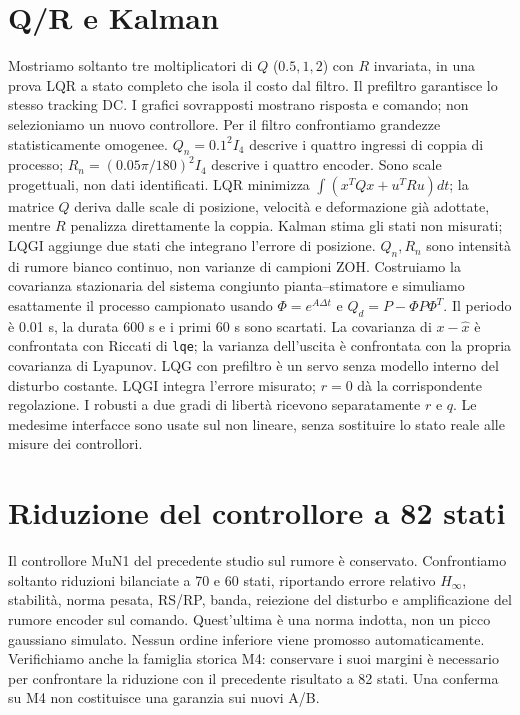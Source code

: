 \section{Q/R e Kalman}
Mostriamo soltanto tre moltiplicatori di $Q$ ($0.5,1,2$) con $R$ invariata,
in una prova LQR a stato completo che isola il costo dal filtro.
Il prefiltro garantisce lo stesso tracking DC. I grafici sovrapposti
mostrano risposta e comando; non selezioniamo un nuovo controllore.
Per il filtro confrontiamo grandezze statisticamente omogenee.
$Q_n=0.1^2I_4$ descrive i quattro ingressi di coppia di processo;
$R_n=(0.05\pi/180)^2I_4$ descrive i quattro encoder. Sono scale progettuali,
non dati identificati. LQR minimizza $\int(x^TQx+u^TRu)dt$; la matrice
$Q$ deriva dalle scale di posizione, velocità e deformazione già adottate,
mentre $R$ penalizza direttamente la coppia. Kalman stima gli stati non
misurati; LQGI aggiunge due stati che integrano l'errore di posizione.
$Q_n,R_n$ sono intensità di rumore bianco continuo, non varianze di
campioni ZOH. Costruiamo la covarianza stazionaria del sistema congiunto
pianta--stimatore e simuliamo esattamente il processo campionato usando
$\Phi=e^{A\Delta t}$ e $Q_d=P-\Phi P\Phi^T$.
Il periodo è 0.01 s, la durata 600 s e i primi 60 s sono scartati.
La covarianza di $x-\hat x$ è confrontata con Riccati di \texttt{lqe};
la varianza dell'uscita è confrontata con la propria covarianza di Lyapunov.
LQG con prefiltro è un servo senza modello interno del disturbo costante.
LQGI integra l'errore misurato; $r=0$ dà la corrispondente regolazione.
I robusti a due gradi di libertà ricevono separatamente $r$ e $q$.
Le medesime interfacce sono usate sul non lineare, senza sostituire
lo stato reale alle misure dei controllori.
\section{Riduzione del controllore a 82 stati}
Il controllore MuN1 del precedente studio sul rumore è conservato.
Confrontiamo soltanto riduzioni bilanciate a 70 e 60 stati, riportando
errore relativo $H_\infty$, stabilità, norma pesata, RS/RP, banda,
reiezione del disturbo e amplificazione del rumore encoder sul comando.
Quest'ultima è una norma indotta, non un picco gaussiano simulato.
Nessun ordine inferiore viene promosso automaticamente.
Verifichiamo anche la famiglia storica M4: conservare i suoi margini è
necessario per confrontare la riduzione con il precedente risultato a
82 stati. Una conferma su M4 non costituisce una garanzia sui nuovi A/B.


